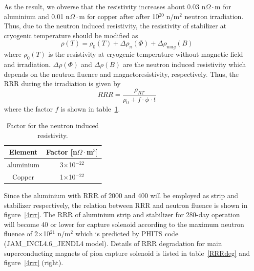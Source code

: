 As the result, we obverse that the resistivity increases about 0.03 n$\Omega\cdot$m for aluminium and 0.01 n$\Omega\cdot$m for copper after after 10$^{20}$ n/m$^2$ neutron irradiation.
Thus, due to the neutron induced resistivity, the resistivity of stabilizer at cryogenic temperature should be modified as
\begin{equation}
 \rho (T) = \rho_0(T) + \Delta \rho_{n} (\Phi) + \Delta \rho_{mag} (B)
\end{equation}
where $\rho_0(T)$ is the resistivity at cryogenic temperature without magnetic field and irradiation.
$\Delta \rho(\Phi)$ and $\Delta \rho(B)$ are the neutron induced resistivity which depends on the neutron fluence and magnetoresistivity, respectively.
Thus, the RRR during the irradiation is given by
\begin{equation}
 RRR = \frac{\rho_{RT}}{\rho_0 + f \cdot \phi \cdot t}
\end{equation}
where the factor $f$ is shown in table~\ref{factorirr}.
\begin{table}[H]
 \centering
 \begin{tabular}{cc} \hline \hline
  Element & Factor [n$\Omega\cdot$m$^3$] \\ \hline
  aluminium & 3$\times$10$^{-22}$ \\
  Copper & 1$\times$10$^{-22}$ \\ \hline \hline
 \end{tabular}
 \caption{Factor for the neutron induced resistivity.}
 \label{factorirr}
\end{table}
Since the aluminium with RRR of 2000 and 400 will be employed as strip and stabilizer respectively, the relation between RRR and neutron fluence is shown in figure~\ref{4rrr}.
The RRR of aluminium strip and stabilizer for 280-day operation will become 40 or lower for capture solenoid according to the maximum neutron fluence of 2$\times$10$^{21}$ n/m$^2$ which is predicted by PHITS code (JAM\_INCL4.6\_JENDL4 model).
Details of RRR degradation for main superconducting magnets of pion capture solenoid is listed in table~\ref{RRRdeg} and figure~\ref{4rrr} (right).
